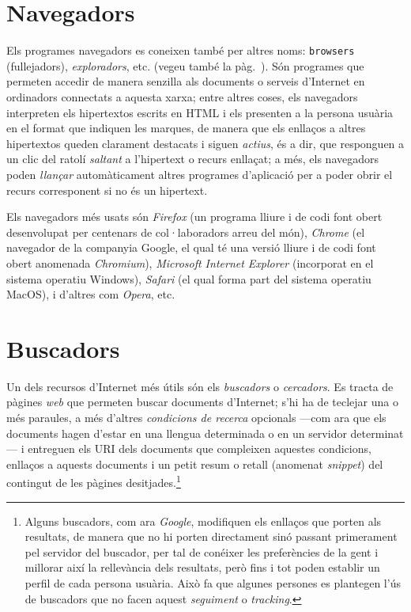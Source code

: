 \section{Navegadors}
\label{ss:navegadors}
Els programes navegadors es coneixen també per altres noms:
\texttt{browsers} (fullejadors), \emph{exploradors}, etc. (vegeu també
la pàg.~\pageref{pg:navegadors}).  Són programes que permeten accedir
de manera senzilla als documents o serveis d'Internet en ordinadors
connectats a aquesta xarxa; entre altres coses, els navegadors
interpreten els hipertextos escrits en HTML i els presenten a la
persona usuària en el format que indiquen les marques, de manera que
els enllaços a altres hipertextos queden clarament destacats i siguen
\emph{actius}, és a dir, que responguen a un clic del ratolí
\emph{saltant} a l'hipertext o recurs enllaçat; a més, els navegadors
poden \emph{llançar} automàticament altres programes d'aplicació per a
poder obrir el recurs corresponent si no és un hipertext. 

Els navegadors més usats són \emph{Firefox} (un programa lliure i de
codi font obert desenvolupat per centenars de col·laboradors arreu del
món), \emph{Chrome} (el navegador de la companyia Google, el qual té
una versió lliure i de codi font obert anomenada \emph{Chromium}),
\emph{Microsoft Internet Explorer} (incorporat en el sistema operatiu
Windows), \emph{Safari} (el qual forma part del sistema operatiu
MacOS), i d'altres com \emph{Opera}, etc.
 

\section{Buscadors}
Un dels recursos d'Internet més útils són els \emph{buscadors} o
\emph{cercadors}. Es tracta de pàgines \emph{web} que permeten buscar
documents d'Internet; s'hi ha de teclejar una o més paraules, a més
d'altres \emph{condicions de recerca} opcionals ---com ara que els
documents hagen d'estar en una llengua determinada o en un servidor
determinat--- i entreguen els URI dels documents que compleixen
aquestes condicions, enllaços a aquests documents i un petit resum o
retall (anomenat \emph{snippet}) del contingut de les pàgines
desitjades.\footnote{Alguns buscadors, com ara \emph{Google},
  modifiquen els enllaços que porten als resultats, de manera que no
  hi porten directament sinó passant primerament pel servidor del
  buscador, per tal de conéixer les preferències de la gent i millorar
  així la rellevància dels resultats, però fins i tot poden establir
  un perfil de cada persona usuària. Això fa que algunes persones es
  plantegen l'ús de buscadors que no facen aquest \emph{seguiment} o
  \emph{tracking}.}

